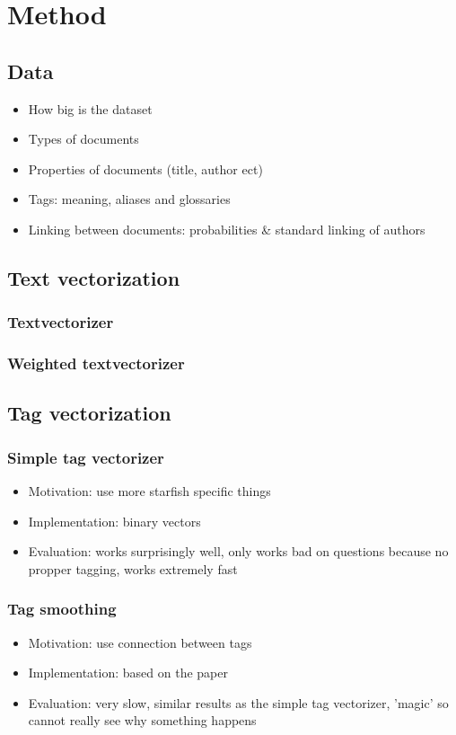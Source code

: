 \section{Method}
\subsection{Data}
\begin{itemize}
\item How big is the dataset
\item Types of documents
\item Properties of documents (title, author ect)
\item Tags: meaning, aliases and glossaries
\item Linking between documents: probabilities \& standard linking of authors
\end{itemize}

\subsection{Text vectorization}
\subsubsection{Textvectorizer}


\subsubsection{Weighted textvectorizer}


\subsection{Tag vectorization}
\subsubsection{Simple tag vectorizer}
\begin{itemize}
\item Motivation: use more starfish specific things
\item Implementation: binary vectors
\item Evaluation: works surprisingly well, only works bad on questions because no propper tagging, works extremely fast
\end{itemize}

\subsubsection{Tag smoothing}
\begin{itemize}
\item Motivation: use connection between tags
\item Implementation: based on the paper
\item Evaluation: very slow, similar results as the simple tag vectorizer, 'magic' so cannot really see why something happens
\end{itemize}

